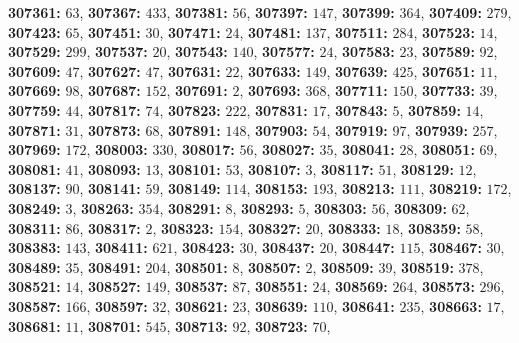 \textsf{\bfseries 307361:} $63$, \textsf{\bfseries 307367:} $433$, \textsf{\bfseries 307381:} $56$, \textsf{\bfseries 307397:} $147$, \textsf{\bfseries 307399:} $364$, \textsf{\bfseries 307409:} $279$, \textsf{\bfseries 307423:} $65$, \textsf{\bfseries 307451:} $30$, \textsf{\bfseries 307471:} $24$, \textsf{\bfseries 307481:} $137$, \textsf{\bfseries 307511:} $284$, \textsf{\bfseries 307523:} $14$, \textsf{\bfseries 307529:} $299$, \textsf{\bfseries 307537:} $20$, \textsf{\bfseries 307543:} $140$, \textsf{\bfseries 307577:} $24$, \textsf{\bfseries 307583:} $23$, \textsf{\bfseries 307589:} $92$, \textsf{\bfseries 307609:} $47$, \textsf{\bfseries 307627:} $47$, \textsf{\bfseries 307631:} $22$, \textsf{\bfseries 307633:} $149$, \textsf{\bfseries 307639:} $425$, \textsf{\bfseries 307651:} $11$, \textsf{\bfseries 307669:} $98$, \textsf{\bfseries 307687:} $152$, \textsf{\bfseries 307691:} $2$, \textsf{\bfseries 307693:} $368$, \textsf{\bfseries 307711:} $150$, \textsf{\bfseries 307733:} $39$, \textsf{\bfseries 307759:} $44$, \textsf{\bfseries 307817:} $74$, \textsf{\bfseries 307823:} $222$, \textsf{\bfseries 307831:} $17$, \textsf{\bfseries 307843:} $5$, \textsf{\bfseries 307859:} $14$, \textsf{\bfseries 307871:} $31$, \textsf{\bfseries 307873:} $68$, \textsf{\bfseries 307891:} $148$, \textsf{\bfseries 307903:} $54$, \textsf{\bfseries 307919:} $97$, \textsf{\bfseries 307939:} $257$, \textsf{\bfseries 307969:} $172$, \textsf{\bfseries 308003:} $330$, \textsf{\bfseries 308017:} $56$, \textsf{\bfseries 308027:} $35$, \textsf{\bfseries 308041:} $28$, \textsf{\bfseries 308051:} $69$, \textsf{\bfseries 308081:} $41$, \textsf{\bfseries 308093:} $13$, \textsf{\bfseries 308101:} $53$, \textsf{\bfseries 308107:} $3$, \textsf{\bfseries 308117:} $51$, \textsf{\bfseries 308129:} $12$, \textsf{\bfseries 308137:} $90$, \textsf{\bfseries 308141:} $59$, \textsf{\bfseries 308149:} $114$, \textsf{\bfseries 308153:} $193$, \textsf{\bfseries 308213:} $111$, \textsf{\bfseries 308219:} $172$, \textsf{\bfseries 308249:} $3$, \textsf{\bfseries 308263:} $354$, \textsf{\bfseries 308291:} $8$, \textsf{\bfseries 308293:} $5$, \textsf{\bfseries 308303:} $56$, \textsf{\bfseries 308309:} $62$, \textsf{\bfseries 308311:} $86$, \textsf{\bfseries 308317:} $2$, \textsf{\bfseries 308323:} $154$, \textsf{\bfseries 308327:} $20$, \textsf{\bfseries 308333:} $18$, \textsf{\bfseries 308359:} $58$, \textsf{\bfseries 308383:} $143$, \textsf{\bfseries 308411:} $621$, \textsf{\bfseries 308423:} $30$, \textsf{\bfseries 308437:} $20$, \textsf{\bfseries 308447:} $115$, \textsf{\bfseries 308467:} $30$, \textsf{\bfseries 308489:} $35$, \textsf{\bfseries 308491:} $204$, \textsf{\bfseries 308501:} $8$, \textsf{\bfseries 308507:} $2$, \textsf{\bfseries 308509:} $39$, \textsf{\bfseries 308519:} $378$, \textsf{\bfseries 308521:} $14$, \textsf{\bfseries 308527:} $149$, \textsf{\bfseries 308537:} $87$, \textsf{\bfseries 308551:} $24$, \textsf{\bfseries 308569:} $264$, \textsf{\bfseries 308573:} $296$, \textsf{\bfseries 308587:} $166$, \textsf{\bfseries 308597:} $32$, \textsf{\bfseries 308621:} $23$, \textsf{\bfseries 308639:} $110$, \textsf{\bfseries 308641:} $235$, \textsf{\bfseries 308663:} $17$, \textsf{\bfseries 308681:} $11$, \textsf{\bfseries 308701:} $545$, \textsf{\bfseries 308713:} $92$, \textsf{\bfseries 308723:} $70$, 
